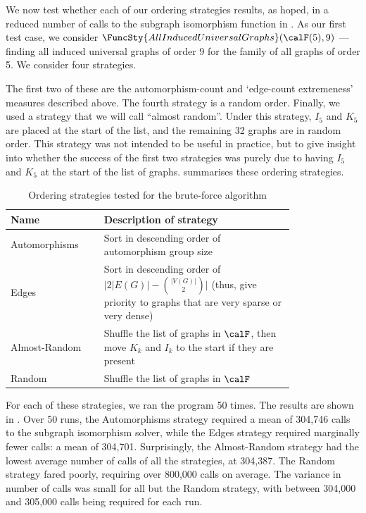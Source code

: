 We now test whether each of our ordering strategies results, as hoped,
in a reduced number of calls to the subgraph isomorphism function
in .  As our first test case, we consider 
$\FuncSty{AllInducedUniversalGraphs}(\calF(5),9)$ ---
finding all induced universal graphs of order 9 for the family of
all graphs of order 5.  We consider four strategies.

The first two of these are the automorphism-count and `edge-count extremeness'
measures described above.  The fourth strategy is a random order.
Finally, we used a strategy that we will call ``almost random''.
Under this strategy, $I_5$ and $K_5$ are placed at the start of the list,
and the remaining 32 graphs are in random order.  This strategy was not
intended to be useful in practice, but to give insight into whether
the success of the first two strategies was purely due to having
$I_5$ and $K_5$ at the start of the list of graphs. 
summarises these ordering strategies.

\begin{table}[htb]
\centering
\footnotesize
 \begin{tabular}{p{0.25\linewidth} p{0.55\linewidth}}
 \toprule
    Name & Description of strategy \\ [0.5ex]
 \midrule
    Automorphisms & Sort in descending order of automorphism group size \\
    Edges & Sort in descending order of $\big|{2|E(G)| - {|V(G)| \choose 2}}\big|$ 
            (thus, give priority to graphs that are very sparse or very dense)\\
    Almost-Random & Shuffle the list of graphs in $\calF$, then move $K_k$ and $I_k$ to the start if they are present \\
    Random & Shuffle the list of graphs in $\calF$ \\
 \bottomrule
\end{tabular}
\caption{Ordering strategies tested for the brute-force algorithm}
\label{tab:ordering-strategies}
\end{table}

For each of these strategies, we ran the program 50 times.
The results are shown in .  Over 50 runs,
the Automorphisms strategy required a mean of 304,746 calls to the subgraph
isomorphism solver, while the Edges strategy required marginally fewer
calls:  a mean of 304,701.  Surprisingly, the Almost-Random
strategy had the lowest average number of calls of all the strategies,
at 304,387.  The Random strategy fared poorly, requiring over 800,000
calls on average.
The variance in number of calls was small for all but the Random strategy,
with between 304,000 and 305,000 calls being required for each run.

